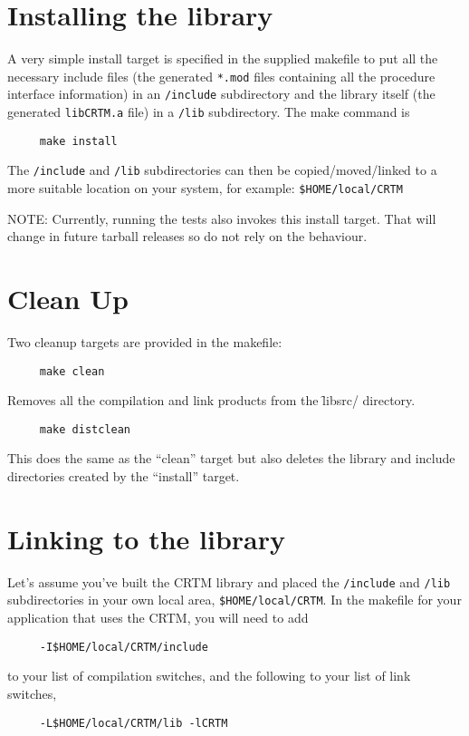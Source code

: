 \section{Installing the library}
A very simple install target is specified in the supplied makefile to put all the necessary include files (the generated \texttt{*.mod} files containing all the procedure interface information) in an \texttt{/include} subdirectory and the library itself (the generated \texttt{libCRTM.a} file) in a \texttt{/lib} subdirectory. The make command is
\begin{verbatim}     make install\end{verbatim}
The \texttt{/include} and \texttt{/lib} subdirectories can then be copied/moved/linked to a more suitable location on your system, for example: \texttt{\$HOME/local/CRTM}

NOTE: Currently, running the tests also invokes this install target. That will change in future tarball releases so do not rely on the behaviour.


\section{Clean Up}
Two cleanup targets are provided in the makefile:

\begin{verbatim}     make clean\end{verbatim}
  
Removes all the compilation and link products from the \f{libsrc/} directory.

\begin{verbatim}     make distclean\end{verbatim} 
  
This does the same as the ``clean'' target but also deletes the library and include directories created by the ``install'' target.


\section{Linking to the library}
Let's assume you've built the CRTM library and placed the \texttt{/include} and \texttt{/lib} subdirectories in your own local area, \texttt{\$HOME/local/CRTM}. In the makefile for your application that uses the CRTM, you will need to add
\begin{verbatim}     -I$HOME/local/CRTM/include\end{verbatim}
to your list of compilation switches, and the following to your list of link switches,
\begin{verbatim}     -L$HOME/local/CRTM/lib -lCRTM\end{verbatim}
